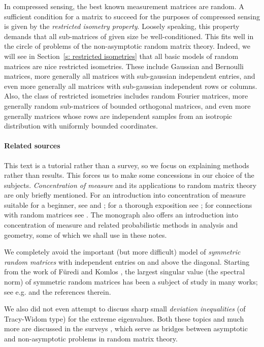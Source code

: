 \documentclass[10pt, openany]{book}
\theoremstyle{remark}
\begin{document}
In compressed sensing, the best known measurement matrices are random. A sufficient
condition for a matrix to succeed for the purposes of compressed sensing
is given by the {\em restricted isometry property}. Loosely speaking, this property 
demands that all sub-matrices of given size be well-conditioned. This fits well in the circle of 
problems of the non-asymptotic random matrix theory. Indeed, we will see in Section~\ref{s: restricted isometries} 
that all basic models 
of random matrices are nice restricted isometries. These include Gaussian and Bernoulli matrices,
more generally all matrices with sub-gaussian independent entries, and even more generally
all matrices with sub-gaussian independent rows or columns. Also, the class of restricted
isometries includes random Fourier matrices, more generally random sub-matrices of 
bounded orthogonal matrices, and even more generally matrices whose rows are independent
samples from an isotropic distribution with uniformly bounded coordinates. 

\paragraph{Related sources}
This text is a tutorial rather than a survey, so we focus on explaining methods rather than results.
This forces us to make some concessions in our choice of the subjects. 
{\em Concentration of measure} and its applications to random matrix theory are only briefly mentioned. 
For an introduction into concentration of measure suitable for a beginner, 
see \cite{Ball} and \cite[Chapter~14]{Matousek}; 
for a thorough exposition see \cite{MS, Ledoux};
for connections with random matrices see \cite{DS, Ledoux extremal}. The monograph \cite{Ledoux-Talagrand}
also offers an introduction into concentration of measure and related probabilistic methods in 
analysis and geometry, some of which we shall use in these notes.

We completely avoid the important (but more difficult) model of {\em symmetric random matrices} 
with independent entries on and above the diagonal. 
Starting from the work of F\"uredi and Komlos \cite{FuKo},
the largest singular value (the spectral norm) of symmetric random matrices has been a subject 
of study in many works; see e.g. \cite{Meckes, Vu, PeSo} and the references therein. 

We also did not even attempt to discuss sharp 
small {\em deviation inequalities} (of Tracy-Widom type) for the extreme eigenvalues. 
Both these topics and much more are discussed in the surveys \cite{DS, Ledoux extremal, RV ICM},
which serve as bridges between asymptotic and non-asymptotic problems in random matrix theory.
\end{document}
